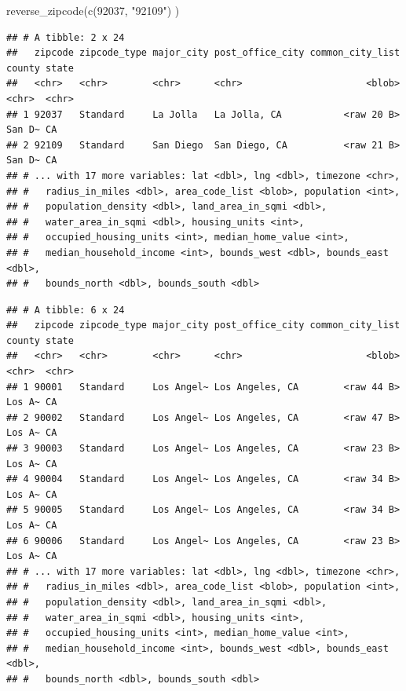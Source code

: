 \documentclass[
]{article}
\newenvironment{Shaded}{\begin{snugshade}}{\end{snugshade}}
\newcommand{\CommentTok}[1]{\textcolor[rgb]{0.56,0.35,0.01}{\textit{#1}}}
\newcommand{\FunctionTok}[1]{\textcolor[rgb]{0.00,0.00,0.00}{#1}}
\newcommand{\NormalTok}[1]{#1}
\newcommand{\OtherTok}[1]{\textcolor[rgb]{0.56,0.35,0.01}{#1}}
\newcommand{\SpecialCharTok}[1]{\textcolor[rgb]{0.00,0.00,0.00}{#1}}
\newcommand{\StringTok}[1]{\textcolor[rgb]{0.31,0.60,0.02}{#1}}
\begin{document}
\begin{Shaded}
\begin{Highlighting}[]
\FunctionTok{reverse\_zipcode}\NormalTok{(}\FunctionTok{c}\NormalTok{(}\StringTok{\textquotesingle{}92037\textquotesingle{}}\NormalTok{, }\StringTok{"92109"}\NormalTok{) )}
\end{Highlighting}
\end{Shaded}

\begin{verbatim}
## # A tibble: 2 x 24
##   zipcode zipcode_type major_city post_office_city common_city_list county state
##   <chr>   <chr>        <chr>      <chr>                      <blob> <chr>  <chr>
## 1 92037   Standard     La Jolla   La Jolla, CA           <raw 20 B> San D~ CA   
## 2 92109   Standard     San Diego  San Diego, CA          <raw 21 B> San D~ CA   
## # ... with 17 more variables: lat <dbl>, lng <dbl>, timezone <chr>,
## #   radius_in_miles <dbl>, area_code_list <blob>, population <int>,
## #   population_density <dbl>, land_area_in_sqmi <dbl>,
## #   water_area_in_sqmi <dbl>, housing_units <int>,
## #   occupied_housing_units <int>, median_home_value <int>,
## #   median_household_income <int>, bounds_west <dbl>, bounds_east <dbl>,
## #   bounds_north <dbl>, bounds_south <dbl>
\end{verbatim}

\begin{Shaded}
\end{Shaded}

\begin{verbatim}
## # A tibble: 6 x 24
##   zipcode zipcode_type major_city post_office_city common_city_list county state
##   <chr>   <chr>        <chr>      <chr>                      <blob> <chr>  <chr>
## 1 90001   Standard     Los Angel~ Los Angeles, CA        <raw 44 B> Los A~ CA   
## 2 90002   Standard     Los Angel~ Los Angeles, CA        <raw 47 B> Los A~ CA   
## 3 90003   Standard     Los Angel~ Los Angeles, CA        <raw 23 B> Los A~ CA   
## 4 90004   Standard     Los Angel~ Los Angeles, CA        <raw 34 B> Los A~ CA   
## 5 90005   Standard     Los Angel~ Los Angeles, CA        <raw 34 B> Los A~ CA   
## 6 90006   Standard     Los Angel~ Los Angeles, CA        <raw 23 B> Los A~ CA   
## # ... with 17 more variables: lat <dbl>, lng <dbl>, timezone <chr>,
## #   radius_in_miles <dbl>, area_code_list <blob>, population <int>,
## #   population_density <dbl>, land_area_in_sqmi <dbl>,
## #   water_area_in_sqmi <dbl>, housing_units <int>,
## #   occupied_housing_units <int>, median_home_value <int>,
## #   median_household_income <int>, bounds_west <dbl>, bounds_east <dbl>,
## #   bounds_north <dbl>, bounds_south <dbl>
\end{verbatim}
\end{document}
